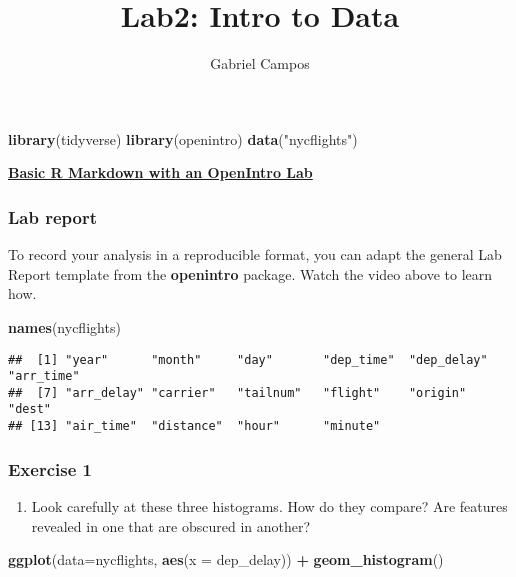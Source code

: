 \documentclass[
]{article}
\title{Lab2: Intro to Data}
\author{Gabriel Campos}
\date{}
\newenvironment{Shaded}{\begin{snugshade}}{\end{snugshade}}
\newcommand{\DataTypeTok}[1]{\textcolor[rgb]{0.13,0.29,0.53}{#1}}
\newcommand{\KeywordTok}[1]{\textcolor[rgb]{0.13,0.29,0.53}{\textbf{#1}}}
\newcommand{\NormalTok}[1]{#1}
\newcommand{\OperatorTok}[1]{\textcolor[rgb]{0.81,0.36,0.00}{\textbf{#1}}}
\newcommand{\StringTok}[1]{\textcolor[rgb]{0.31,0.60,0.02}{#1}}
\providecommand{\tightlist}{%
  \setlength{\itemsep}{0pt}\setlength{\parskip}{0pt}}
\begin{document}
\maketitle

\begin{Shaded}
\begin{Highlighting}[]
\KeywordTok{library}\NormalTok{(tidyverse)}
\KeywordTok{library}\NormalTok{(openintro)}
\KeywordTok{data}\NormalTok{(}\StringTok{"nycflights"}\NormalTok{)}
\end{Highlighting}
\end{Shaded}

\href{https://www.youtube.com/watch?v=Pdc368lS2hk}{\textbf{Basic R
Markdown with an OpenIntro Lab}}

\hypertarget{lab-report}{%
\subsubsection{Lab report}\label{lab-report}}

To record your analysis in a reproducible format, you can adapt the
general Lab Report template from the \textbf{openintro} package. Watch
the video above to learn how.

\begin{Shaded}
\begin{Highlighting}[]
\KeywordTok{names}\NormalTok{(nycflights)}
\end{Highlighting}
\end{Shaded}

\begin{verbatim}
##  [1] "year"      "month"     "day"       "dep_time"  "dep_delay" "arr_time" 
##  [7] "arr_delay" "carrier"   "tailnum"   "flight"    "origin"    "dest"     
## [13] "air_time"  "distance"  "hour"      "minute"
\end{verbatim}

\hypertarget{exercise-1}{%
\subsubsection{Exercise 1}\label{exercise-1}}

\begin{enumerate}
\def\labelenumi{\arabic{enumi}.}
\tightlist
\item
  Look carefully at these three histograms. How do they compare? Are
  features revealed in one that are obscured in another?
\end{enumerate}

\begin{Shaded}
\begin{Highlighting}[]
\KeywordTok{ggplot}\NormalTok{(}\DataTypeTok{data=}\NormalTok{nycflights, }\KeywordTok{aes}\NormalTok{(}\DataTypeTok{x =}\NormalTok{ dep_delay)) }\OperatorTok{+}
\StringTok{    }\KeywordTok{geom_histogram}\NormalTok{()}
\end{Highlighting}
\end{Shaded}
\end{document}
